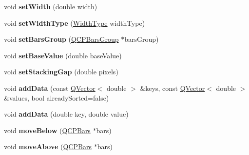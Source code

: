 \begin{DoxyCompactItemize}
\item 
void {\bfseries set\+Width} (double width)\hypertarget{class_q_c_p_bars_afec6116579d44d5b706e0fa5e5332507}{}\label{class_q_c_p_bars_afec6116579d44d5b706e0fa5e5332507}

\item 
void {\bfseries set\+Width\+Type} (\hyperlink{class_q_c_p_bars_a65dbbf1ab41cbe993d71521096ed4649}{Width\+Type} width\+Type)\hypertarget{class_q_c_p_bars_adcaa3b41281bb2c0f7949b341592fcc0}{}\label{class_q_c_p_bars_adcaa3b41281bb2c0f7949b341592fcc0}

\item 
void {\bfseries set\+Bars\+Group} (\hyperlink{class_q_c_p_bars_group}{Q\+C\+P\+Bars\+Group} $\ast$bars\+Group)\hypertarget{class_q_c_p_bars_aedd1709061f0b307c47ddb45e172ef9a}{}\label{class_q_c_p_bars_aedd1709061f0b307c47ddb45e172ef9a}

\item 
void {\bfseries set\+Base\+Value} (double base\+Value)\hypertarget{class_q_c_p_bars_a574ec7eb7537566df1a28ff085d75623}{}\label{class_q_c_p_bars_a574ec7eb7537566df1a28ff085d75623}

\item 
void {\bfseries set\+Stacking\+Gap} (double pixels)\hypertarget{class_q_c_p_bars_aeacf7561afb1c70284b22822b57c7bb5}{}\label{class_q_c_p_bars_aeacf7561afb1c70284b22822b57c7bb5}

\item 
void {\bfseries add\+Data} (const \hyperlink{class_q_vector}{Q\+Vector}$<$ double $>$ \&keys, const \hyperlink{class_q_vector}{Q\+Vector}$<$ double $>$ \&values, bool already\+Sorted=false)\hypertarget{class_q_c_p_bars_a323d6970d6d6e3166d89916a7f60f733}{}\label{class_q_c_p_bars_a323d6970d6d6e3166d89916a7f60f733}

\item 
void {\bfseries add\+Data} (double key, double value)\hypertarget{class_q_c_p_bars_a684dd105403a5497fda42f2094fecbb7}{}\label{class_q_c_p_bars_a684dd105403a5497fda42f2094fecbb7}

\item 
void {\bfseries move\+Below} (\hyperlink{class_q_c_p_bars}{Q\+C\+P\+Bars} $\ast$bars)\hypertarget{class_q_c_p_bars_a69fc371346980f19177c3d1ecdad78ee}{}\label{class_q_c_p_bars_a69fc371346980f19177c3d1ecdad78ee}

\item 
void {\bfseries move\+Above} (\hyperlink{class_q_c_p_bars}{Q\+C\+P\+Bars} $\ast$bars)\hypertarget{class_q_c_p_bars_ac22e00a6a41509538c21b04f0a57318c}{}\label{class_q_c_p_bars_ac22e00a6a41509538c21b04f0a57318c}


\end{DoxyCompactItemize}
